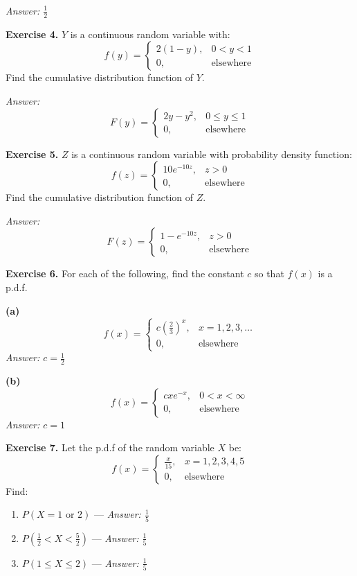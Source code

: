 \documentclass[
]{article}
\providecommand{\tightlist}{%
  \setlength{\itemsep}{0pt}\setlength{\parskip}{0pt}}
\begin{document}
\emph{Answer: \(\frac{1}{2}\)}

\textbf{Exercise 4.} \(Y\) is a continuous random variable with:
\[f(y) = \begin{cases} 2(1-y), & 0 < y < 1 \\ 0, & \text{elsewhere} \end{cases}\]
Find the cumulative distribution function of \(Y\).

\emph{Answer:}
\[F(y) = \begin{cases} 2y - y^2, & 0 \leq y \leq 1 \\ 0, & \text{elsewhere} \end{cases}\]

\textbf{Exercise 5.} \(Z\) is a continuous random variable with
probability density function:
\[f(z) = \begin{cases} 10e^{-10z}, & z > 0 \\ 0, & \text{elsewhere} \end{cases}\]
Find the cumulative distribution function of \(Z\).

\emph{Answer:}
\[F(z) = \begin{cases} 1 - e^{-10z}, & z > 0 \\ 0, & \text{elsewhere} \end{cases}\]

\textbf{Exercise 6.} For each of the following, find the constant \(c\)
so that \(f(x)\) is a p.d.f.

\textbf{(a)}
\[f(x) = \begin{cases} c\left(\frac{2}{3}\right)^x, & x = 1, 2, 3, \ldots \\ 0, & \text{elsewhere} \end{cases}\]
\emph{Answer: \(c = \frac{1}{2}\)}

\textbf{(b)}
\[f(x) = \begin{cases} cxe^{-x}, & 0 < x < \infty \\ 0, & \text{elsewhere} \end{cases}\]
\emph{Answer: \(c = 1\)}

\textbf{Exercise 7.} Let the p.d.f of the random variable \(X\) be:
\[f(x) = \begin{cases} \frac{x}{15}, & x = 1, 2, 3, 4, 5 \\ 0, & \text{elsewhere} \end{cases}\]
Find:

\begin{enumerate}
\def\labelenumi{\arabic{enumi}.}
\tightlist
\item
  \(P(X = 1 \text{ or } 2)\) --- \emph{Answer: \(\frac{1}{5}\)}
\item
  \(P\!\left(\frac{1}{2} < X < \frac{5}{2}\right)\) --- \emph{Answer:
  \(\frac{1}{5}\)}
\item
  \(P(1 \leq X \leq 2)\) --- \emph{Answer: \(\frac{1}{5}\)}
\end{enumerate}
\end{document}
